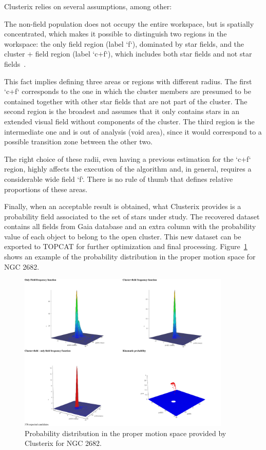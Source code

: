 \documentclass[11pt, a4paper, english]{book}
\begin{document}
Clusterix relies on several assumptions, among other:

\begin{displayquote}
The non-field population does not occupy the entire workspace, but is spatially concentrated,
which makes it possible to distinguish two regions in the workspace:
the only field region (label `f`), dominated by star fields,
and the cluster + field region (label `c+f`), which includes both star fields and not star
fields~\cite{balaguer2020clusterix}.
\end{displayquote}

This fact implies defining three areas or regions with different radius.
The first `c+f` corresponds to the one in which the cluster members are
presumed to be contained together with other star fields that are not part of the cluster.
The second region is the broadest and assumes that it only contains stars
in an extended visual field without components of the cluster.
The third region is the intermediate one and is out of analysis (void area),
since it would correspond to a possible transition zone between the other two.

The right choice of these radii, even having a previous estimation for the `c+f` region,
highly affects the execution of the algorithm and, in general, requires a considerable wide field `f`.
There is no rule of thumb that defines relative proportions of these areas.

Finally, when an acceptable result is obtained,
what Clusterix provides is a probability field associated to the set of stars under study.
The recovered dataset contains all fields from Gaia database
and an extra column with the probability value of each object to belong to the open cluster.
This new dataset can be exported to TOPCAT for further optimization and final processing.
Figure~\ref{fig:clusterix_probability} shows an example of the probability distribution
in the proper motion space for NGC 2682.

\begin{figure}[htbp]
  \centering
  \includegraphics[width=0.9\textwidth]{../figures/clusterix/statistics.pdf}
  \caption{Probability distribution in the proper motion space provided by Clusterix for NGC 2682.}
  \label{fig:clusterix_probability}
\end{figure}
\end{document}
